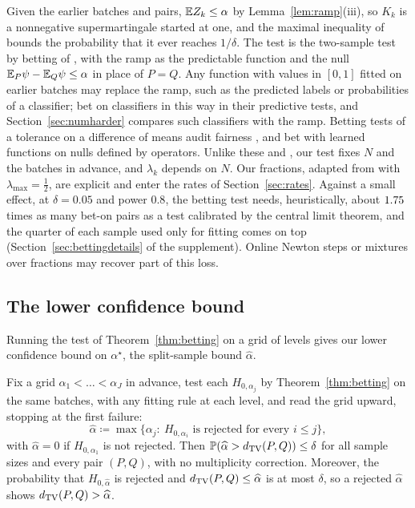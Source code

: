 Given the earlier batches and pairs, $\mathbb{E} Z_k\le\alpha$ by Lemma~\ref{lem:ramp}(iii), so $K_k$ is a nonnegative
supermartingale started at one, and the maximal inequality of \citet{ville1939} bounds the probability that it ever
reaches $1/\delta$. The test is the two-sample test by betting of \citet{shekhar2024nonparametric}, with the ramp as
the predictable function and the null $\mathbb{E}_P\psi-\mathbb{E}_Q\psi\le\alpha$ in place of $P=Q$. Any function with
values in $[0,1]$ fitted on earlier batches may replace the ramp, such as the predicted labels or probabilities of a
classifier; \citet{podkopaev2023sequential} bet on classifiers in this way in their predictive tests, and
Section~\ref{sec:numharder} compares such classifiers with the ramp. Betting tests of a tolerance on a difference of means audit fairness
\citep{chugg2023auditing}, and \citet{pandeva2024deep} bet with learned functions on nulls defined by operators. Unlike
these and \citet{shekhar2024nonparametric}, our test fixes $N$ and the batches in advance, and $\lambda_k$ depends on
$N$. Our fractions, adapted from \citet[Remark~1]{waudbysmith2024estimating} with $\lambda_{\max}=\tfrac12$, are
explicit and enter the rates of Section~\ref{sec:rates}. Against a small effect, at $\delta=0.05$ and power $0.8$, the
betting test needs, heuristically, about $1.75$ times as many bet-on pairs as a test calibrated by the
central limit theorem, and the quarter of each sample used only for fitting comes on top
(Section~\ref{sec:bettingdetails} of the supplement). Online Newton steps or mixtures over fractions may recover part
of this loss.

\subsection{The lower confidence bound}
\label{sec:lower}

Running the test of Theorem~\ref{thm:betting} on a grid of levels gives our lower confidence bound on $\alpha^\star$, the
split-sample bound $\widehat\alpha$.

\begin{corollary}
\label{cor:lower}
Fix a grid $\alpha_1<\dots<\alpha_J$ in advance, test each $H_{0,\alpha_j}$ by Theorem~\ref{thm:betting} on the same
batches, with any fitting rule at each level, and read the grid upward, stopping at the first failure:
\begin{equation}
\widehat\alpha\coloneqq\max\big\{\alpha_j:\ H_{0,\alpha_i}\text{ is rejected for every }i\le j\big\},
\label{eq:downclosed}
\end{equation}
with $\widehat\alpha=0$ if $H_{0,\alpha_1}$ is not rejected. Then
$\mathbb{P}(\widehat\alpha>d_{\mathrm{TV}}(P,Q))\le\delta$ for all sample sizes and every pair $(P,Q)$, with no
multiplicity correction. Moreover, the probability that $H_{0,\widehat\alpha}$ is rejected and
$d_{\mathrm{TV}}(P,Q)\le\widehat\alpha$ is at most $\delta$, so a rejected $\widehat\alpha$ shows
$d_{\mathrm{TV}}(P,Q)>\widehat\alpha$.
\end{corollary}

